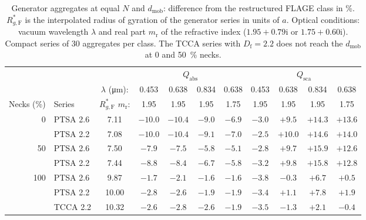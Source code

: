 \documentclass[11pt,a4paper]{article}
\newcommand{\Df}{D_\text{f}}
\begin{document}
\begin{table}[htbp]
  \centering
  \caption{Generator aggregates at equal $N$ and $d_\text{mob}$: difference from the restructured FLAGE class in \%.
  $R_{g,\text{F}}^*$ is the interpolated radius of gyration of the generator series in units of $a$.
  Optical conditions: vacuum wavelength $\lambda$ and real part $m_\text{r}$ of the refractive index ($1.95 + 0.79\mathrm{i}$ or $1.75 + 0.60\mathrm{i}$).
  Compact series of 30 aggregates per class.
  The TCCA series with $\Df = 2.2$ does not reach the $d_\text{mob}$ at 0 and \SI{50}{\percent} necks.}
  \label{tab:equal-dmob}
  \footnotesize
  \setlength{\tabcolsep}{4pt}
  \begin{tabular}{rlccccccccc}
    \toprule
    & & & \multicolumn{4}{c}{$Q_\text{abs}$} & \multicolumn{4}{c}{$Q_\text{sca}$} \\
    \cmidrule(lr){4-7}\cmidrule(lr){8-11}
    & & $\lambda$ (\si{\micro\meter}): & 0.453 & 0.638 & 0.834 & 0.638 & 0.453 & 0.638 & 0.834 & 0.638 \\
    Necks (\%) & Series & $R_{g,\text{F}}^*$ \quad $m_\text{r}$: & 1.95 & 1.95 & 1.95 & 1.75 & 1.95 & 1.95 & 1.95 & 1.75 \\
    \midrule
    0   & PTSA 2.6 & 7.11  & $-10.0$ & $-10.4$ & $-9.0$ & $-6.9$ & $-3.0$ & $+9.5$  & $+14.3$ & $+13.6$ \\
        & PTSA 2.2 & 7.08  & $-10.0$ & $-10.4$ & $-9.1$ & $-7.0$ & $-2.5$ & $+10.0$ & $+14.6$ & $+14.0$ \\
    50  & PTSA 2.6 & 7.50  & $-7.9$  & $-7.5$  & $-5.8$ & $-5.1$ & $-2.8$ & $+9.7$  & $+15.9$ & $+12.6$ \\
        & PTSA 2.2 & 7.44  & $-8.8$  & $-8.4$  & $-6.7$ & $-5.8$ & $-3.2$ & $+9.8$  & $+15.8$ & $+12.8$ \\
    100 & PTSA 2.6 & 9.87  & $-1.7$  & $-2.1$  & $-1.6$ & $-1.6$ & $-3.8$ & $-0.3$  & $+6.7$  & $+0.5$ \\
        & PTSA 2.2 & 10.00 & $-2.8$  & $-2.6$  & $-1.9$ & $-1.9$ & $-3.4$ & $+1.1$  & $+7.8$  & $+1.9$ \\
        & TCCA 2.2 & 10.32 & $-2.6$  & $-2.8$  & $-2.6$ & $-1.9$ & $-3.5$ & $-1.3$  & $+2.1$  & $-0.4$ \\
    \bottomrule
  \end{tabular}
\end{table}
\end{document}
